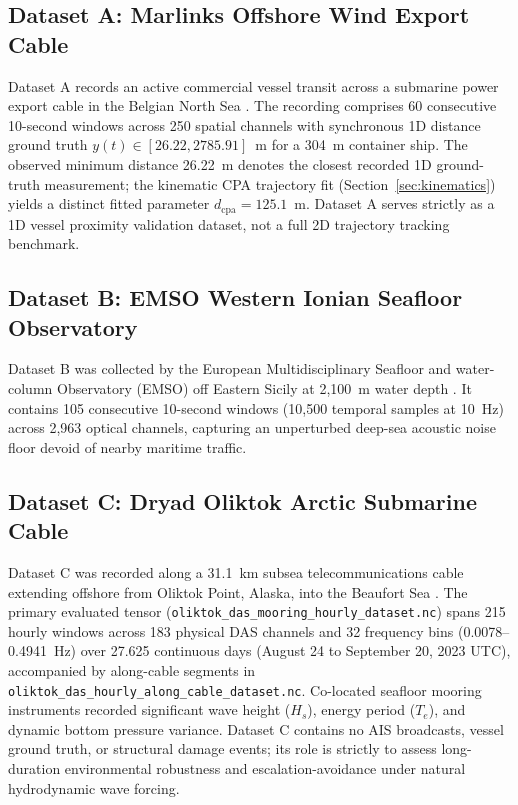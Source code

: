 \documentclass[conference]{IEEEtran}
\begin{document}
\subsection{Dataset A: Marlinks Offshore Wind Export Cable}
Dataset A records an active commercial vessel transit across a submarine power export cable in the Belgian North Sea \cite{b12}. The recording comprises 60 consecutive 10-second windows across 250 spatial channels with synchronous 1D distance ground truth $y(t) \in [26.22, 2785.91]$~m for a 304~m container ship. The observed minimum distance 26.22~m denotes the closest recorded 1D ground-truth measurement; the kinematic CPA trajectory fit (Section~\ref{sec:kinematics}) yields a distinct fitted parameter $d_{\mathrm{cpa}} = 125.1$~m. Dataset A serves strictly as a 1D vessel proximity validation dataset, not a full 2D trajectory tracking benchmark.

\subsection{Dataset B: EMSO Western Ionian Seafloor Observatory}
Dataset B was collected by the European Multidisciplinary Seafloor and water-column Observatory (EMSO) off Eastern Sicily at 2{,}100~m water depth \cite{b11}. It contains 105 consecutive 10-second windows (10,500 temporal samples at 10~Hz) across 2{,}963 optical channels, capturing an unperturbed deep-sea acoustic noise floor devoid of nearby maritime traffic.

\subsection{Dataset C: Dryad Oliktok Arctic Submarine Cable}
Dataset C was recorded along a 31.1~km subsea telecommunications cable extending offshore from Oliktok Point, Alaska, into the Beaufort Sea \cite{b15}. The primary evaluated tensor (\texttt{oliktok\_das\_mooring\_hourly\_dataset.nc}) spans 215 hourly windows across 183 physical DAS channels and 32 frequency bins (0.0078--0.4941~Hz) over 27.625 continuous days (August 24 to September 20, 2023 UTC), accompanied by along-cable segments in \texttt{oliktok\_das\_hourly\_along\_cable\_dataset.nc}. Co-located seafloor mooring instruments recorded significant wave height ($H_s$), energy period ($T_e$), and dynamic bottom pressure variance. Dataset C contains no AIS broadcasts, vessel ground truth, or structural damage events; its role is strictly to assess long-duration environmental robustness and escalation-avoidance under natural hydrodynamic wave forcing.
\end{document}

